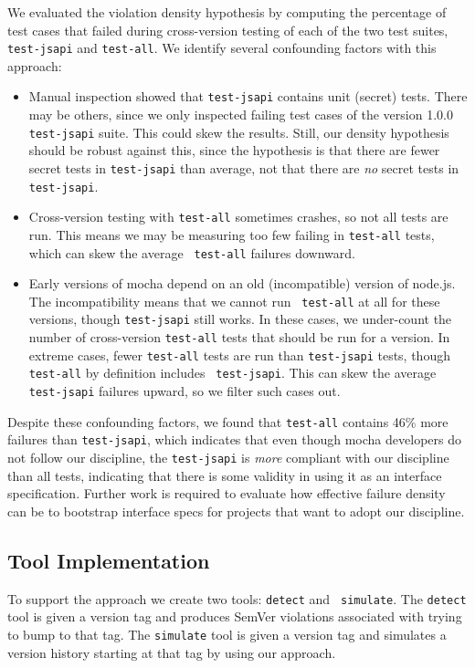 We evaluated the violation density hypothesis by computing the
percentage of test cases that failed during cross-version testing of
each of the two test suites, {\tt test-jsapi} and {\tt test-all}.  We
identify several confounding factors with this approach:
\begin{itemize}
\item Manual inspection showed that {\tt test-jsapi} contains unit
  (secret) tests. There may be others, since we only inspected failing
  test cases of the version 1.0.0 {\tt test-jsapi} suite. This could
  skew the results. Still, our density hypothesis should be robust
  against this, since the hypothesis is that there are fewer secret
  tests in {\tt test-jsapi} than average, not that there are {\em no}
  secret tests in {\tt test-jsapi}.
\item Cross-version testing with {\tt test-all} sometimes crashes, so
  not all tests are run. This means we may be measuring too few
  failing in {\tt test-all} tests, which can skew the average {\tt
    test-all} failures downward.
\item Early versions of mocha depend on an old (incompatible) version
  of node.js. The incompatibility means that we cannot run {\tt
    test-all} at all for these versions, though {\tt test-jsapi} still
  works. In these cases, we under-count the number of cross-version
  {\tt test-all} tests that should be run for a version. In extreme
  cases, fewer {\tt test-all} tests are run than {\tt test-jsapi}
  tests, though {\tt test-all} by definition includes {\tt
    test-jsapi}. This can skew the average {\tt test-jsapi} failures
  upward, so we filter such cases out.
\end{itemize}

Despite these confounding factors, we found that {\tt test-all}
contains 46\% more failures than {\tt test-jsapi}, which indicates
that even though mocha developers do not follow our discipline, the
{\tt test-jsapi} is {\em more} compliant with our discipline than all
tests, indicating that there is some validity in using it as an
interface specification.  Further work is required to evaluate how
effective failure density can be to bootstrap interface specs for
projects that want to adopt our discipline.

\subsection{Tool Implementation}
To support the approach we create two tools: {\tt detect} and {\tt
  simulate}. The {\tt detect} tool is given a version tag and
produces SemVer violations associated with trying to bump to that
tag. The {\tt simulate} tool is given a version tag and simulates a
version history starting at that tag by using our approach.

